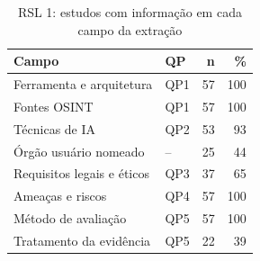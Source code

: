 \begin{table}[htbp]
\centering
\caption{RSL 1: estudos com informação em cada campo da extração}
\label{tab:cobertura-rsl1}
\small
\begin{tabular}{p{6cm}lrr}
\hline
\textbf{Campo} & \textbf{QP} & \textbf{n} & \textbf{\%} \\
\hline
Ferramenta e arquitetura & QP1 & 57 & 100 \\
Fontes OSINT & QP1 & 57 & 100 \\
Técnicas de IA & QP2 & 53 & 93 \\
Órgão usuário nomeado & -- & 25 & 44 \\
Requisitos legais e éticos & QP3 & 37 & 65 \\
Ameaças e riscos & QP4 & 57 & 100 \\
Método de avaliação & QP5 & 57 & 100 \\
Tratamento da evidência & QP5 & 22 & 39 \\
\hline
\end{tabular}
\end{table}
